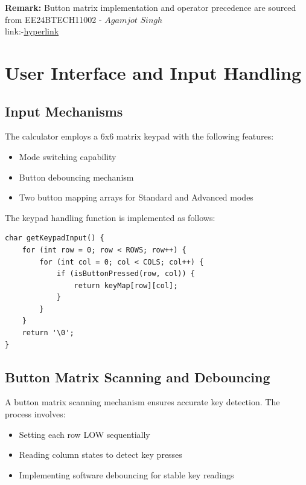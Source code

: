 \documentclass[journal]{IEEEtran}
\numberwithin{equation}{enumi}
\numberwithin{figure}{enumi}
\begin{document}
\textbf{Remark:}
 Button matrix implementation and operator precedence are sourced from EE24BTECH11002 - $Agamjot \,\, Singh$\\
 
 link:-\href{https://github.com/agamjotsingh1/EE1003/tree/main/hardware/embedded_c/calci}{hyperlink}
\newpage
\section{User Interface and Input Handling}

\subsection{Input Mechanisms}

The calculator employs a 6x6 matrix keypad with the following features:

\begin{itemize}
    \item Mode switching capability
    \item Button debouncing mechanism
    \item Two button mapping arrays for Standard and Advanced modes
\end{itemize}

The keypad handling function is implemented as follows:

\begin{lstlisting}[caption=Keypad Input Handling, label=lst:keypad]
char getKeypadInput() {
    for (int row = 0; row < ROWS; row++) {
        for (int col = 0; col < COLS; col++) {
            if (isButtonPressed(row, col)) {
                return keyMap[row][col];
            }
        }
    }
    return '\0';
}
\end{lstlisting}

\subsection{Button Matrix Scanning and Debouncing}

A button matrix scanning mechanism ensures accurate key detection. The process involves:

\begin{itemize}
    \item Setting each row LOW sequentially
    \item Reading column states to detect key presses
    \item Implementing software debouncing for stable key readings
\end{itemize}
\end{document}
